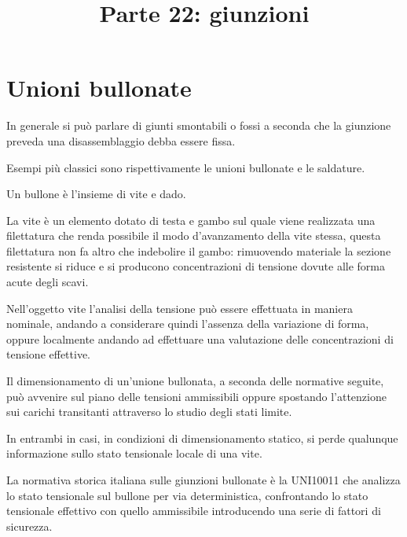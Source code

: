 \documentclass[a4paper, 15pt]{article}
\title{Parte 22: giunzioni}
\date{}
\begin{document}
\maketitle
{}
\setcounter{tocdepth}{5}  %
\tableofcontents 
\newpage



\section{Unioni bullonate}
\begin{adjustwidth}{2in}{}
	In generale si può parlare di giunti smontabili o fossi a seconda che la giunzione preveda una disassemblaggio debba essere fissa. 
	
	Esempi più classici sono rispettivamente le unioni bullonate e le saldature. \newline 
	
	 Un bullone è l'insieme di vite e dado. 
	 
	 La vite è un elemento dotato di testa e gambo sul quale viene realizzata una filettatura che renda possibile il modo d'avanzamento della vite stessa, questa filettatura non fa altro che indebolire il gambo: rimuovendo materiale la sezione resistente si riduce e si producono concentrazioni di tensione dovute alle forma acute degli scavi. 
	 
	 Nell'oggetto vite l'analisi della tensione può essere effettuata in maniera nominale, andando a considerare quindi l'assenza della variazione di forma, oppure localmente andando ad effettuare una valutazione delle concentrazioni di tensione effettive. \newline 
	 
	 Il dimensionamento di un'unione bullonata, a seconda delle normative seguite, può avvenire sul piano delle tensioni ammissibili oppure spostando l'attenzione sui carichi transitanti attraverso lo studio degli stati limite. 
	 
	 In entrambi in casi, in condizioni di dimensionamento statico, si perde qualunque informazione sullo stato tensionale locale di una vite. \newline 
	 
	 La normativa storica italiana sulle giunzioni bullonate è la UNI10011 che analizza lo stato tensionale sul bullone per via deterministica, confrontando lo stato tensionale effettivo con quello ammissibile introducendo una serie di fattori di sicurezza. \newline 
	 

\end{adjustwidth}
\end{document}
